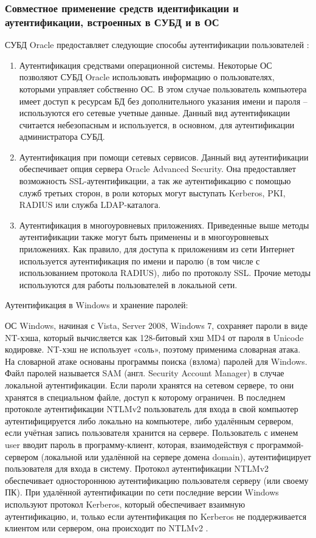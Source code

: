 \subsubsection{Совместное применение средств идентификации и аутентификации, встроенных в СУБД и в ОС}
СУБД Oracle предоставляет следующие способы аутентификации
пользователей \cite{privacy-oracle}:
\begin{enumerate}
    \item Аутентификация средствами операционной системы. Некоторые ОС
        позволяют СУБД Oracle использовать информацию о пользователях, которыми
        управляет собственно ОС. В этом случае пользователь компьютера имеет доступ к
        ресурсам БД без дополнительного указания имени и пароля – используются его
        сетевые учетные данные. Данный вид аутентификации считается небезопасным и
        используется, в основном, для аутентификации администратора СУБД.
    \item Аутентификация при помощи сетевых сервисов. Данный вид аутентификации
        обеспечивает опция сервера Oracle Advanced Security. Она предоставляет
        возможность SSL-аутентификации, а так же аутентификацию с помощью служб
        третьих сторон, в роли которых могут выступать Kerberos, PKI, RADIUS или служба
        LDAP-каталога.
    \item Аутентификация в многоуровневых приложениях. Приведенные выше
        методы аутентификации также могут быть применены и в многоуровневых
        приложениях. Как правило, для доступа к приложениям из сети Интернет используется
        аутентификация по имени и паролю (в том числе с использованием протокола
        RADIUS), либо по протоколу SSL. Прочие методы используются для работы
        пользователей в локальной сети.
\end{enumerate}

Аутентификация в Windows и хранение паролей:

ОС Windows, начиная с Vista, Server 2008, Windows 7, сохраняет пароли в виде NT-хэша, который
вычисляется как 128-битовый хэш MD4 от пароля в Unicode кодировке. NT-хэш не использует «соль»,
поэтому применима словарная атака. На словарной атаке основаны программы поиска (взлома) паролей
для Windows. Файл паролей называется SAM (англ. Security Account Manager) в случае локальной
аутентификации. Если пароли хранятся на сетевом сервере, то они хранятся в специальном файле,
доступ к которому ограничен.
В последнем протоколе аутентификации NTLMv2 пользователь для входа в свой компьютер
аутентифицируется либо локально на компьютере, либо удалённым сервером, если учётная запись
пользователя хранится на сервере.
Пользователь с именем user вводит пароль в программу-клиент, которая, взаимодействуя с
программой-сервером (локальной или удалённой на сервере домена domain), аутентифицирует
пользователя для входа в систему.
Протокол аутентификации NTLMv2 обеспечивает одностороннюю аутентификацию пользователя серверу (или
своему ПК).
При удалённой аутентификации по сети последние версии Windows используют протокол Kerberos, который
обеспечивает взаимную аутентификацию, и, только если аутентификация по Kerberos не поддерживается
клиентом или сервером, она происходит по NTLMv2 \cite{crypto-methods}.


